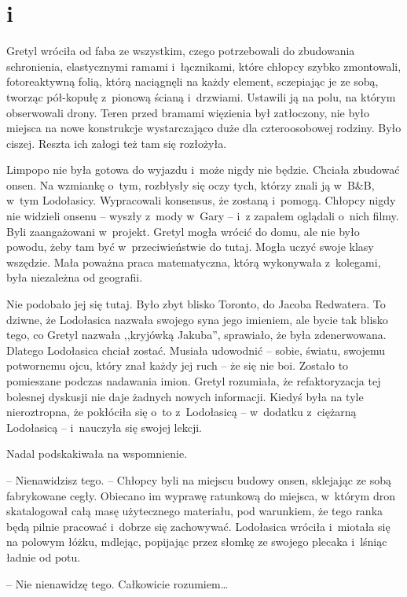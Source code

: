 \documentclass[oneside,polish,11pt,sfheadings]{mwbk}
\begin{document}
\chapter*{i}
Gretyl wróciła od faba ze wszystkim, czego potrzebowali do zbudowania
schronienia, elastycznymi ramami i~łącznikami, które chłopcy szybko
zmontowali, fotoreaktywną folią, którą naciągnęli na każdy element,
sczepiając je ze sobą, tworząc pół-kopułę z~pionową ścianą i~drzwiami.
Ustawili ją na polu, na którym obserwowali drony. Teren przed bramami
więzienia był zatłoczony, nie było miejsca na nowe konstrukcje
wystarczająco duże dla czteroosobowej rodziny. Było ciszej. Reszta ich
załogi też tam się rozłożyła.

Limpopo nie była gotowa do wyjazdu i~może nigdy nie będzie. Chciała
zbudować onsen. Na wzmiankę o~tym, rozbłysły się oczy tych, którzy znali
ją w~B\&B, w~tym Lodołasicy. Wypracowali konsensus, że zostaną i~pomogą.
Chłopcy nigdy nie widzieli onsenu -- wyszły z~mody w~Gary -- i~z zapałem
oglądali o~nich filmy. Byli zaangażowani w~projekt. Gretyl mogła wrócić
do domu, ale nie było powodu, żeby tam być w~przeciwieństwie do tutaj.
Mogła uczyć swoje klasy wszędzie. Mała poważna praca matematyczna, którą
wykonywała z~kolegami, była niezależna od geografii.

Nie podobało jej się tutaj. Było zbyt blisko Toronto, do Jacoba
Redwatera. To dziwne, że Lodołasica nazwała swojego syna jego imieniem,
ale bycie tak blisko tego, co Gretyl nazwała ,,kryjówką Jakuba'',
sprawiało, że była zdenerwowana. Dlatego Lodołasica chciał zostać.
Musiała udowodnić -- sobie, światu, swojemu potwornemu ojcu, który znał
każdy jej ruch -- że się nie boi. Zostało to pomieszane podczas nadawania
imion. Gretyl rozumiała, że refaktoryzacja tej bolesnej dyskusji nie
daje żadnych nowych informacji. Kiedyś była na tyle nieroztropna, że
pokłóciła się o~to z~Lodołasicą -- w~dodatku z~ciężarną Lodołasicą -- i~nauczyła się swojej lekcji.

Nadal podskakiwała na wspomnienie.

-- Nienawidzisz tego. -- Chłopcy byli na miejscu budowy onsen, sklejając
ze sobą fabrykowane cegły. Obiecano im wyprawę ratunkową do miejsca, w~którym dron skatalogował całą masę użytecznego materiału, pod warunkiem,
że tego ranka będą pilnie pracować i~dobrze się zachowywać. Lodołasica
wróciła i~miotała się na polowym łóżku, mdlejąc, popijając przez słomkę
ze swojego plecaka i~lśniąc ładnie od potu.

-- Nie nienawidzę tego. Całkowicie rozumiem\ldots 
\end{document}
